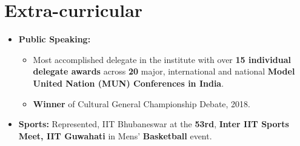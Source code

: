 \documentclass[a4paper,20pt]{article}
\newcommand{\resumeItem}[2]{
  \item\small{
    {#1}{#2 \vspace{-2pt}}
  }
}
\newcommand{\resumeSubItem}[2]{\resumeItem{#1}{#2}\vspace{-2pt}}
\newcommand{\resumeSubHeadingListStart}{\begin{itemize}[leftmargin=*]}
\newcommand{\resumeSubHeadingListEnd}{\end{itemize}}
\newcommand{\resumeItemListStart}{\begin{itemize}}
\newcommand{\resumeItemListEnd}{\end{itemize}\vspace{-2.2pt}}
\begin{document}
\section{Extra-curricular}
\resumeSubHeadingListStart
\resumeSubItem{\textbf{Public Speaking: }}
{}
\vspace{-4pt}
\resumeItemListStart[leftmargin=*]
        \resumeItem{}
          {\normalsize{Most accomplished delegate in the institute with over \textbf{15 individual delegate awards} across \textbf{20} major, international and national \textbf{Model United Nation (MUN) Conferences in India}}.}
        \resumeItem{}
          {\textbf{Winner} of Cultural General Championship Debate, 2018.}
\resumeItemListEnd
\vspace{-4pt}
\resumeSubItem{\textbf{Sports: }}{Represented, IIT Bhubaneswar at the \textbf{53rd}, \textbf{Inter IIT Sports Meet, IIT Guwahati} in Mens’ \textbf{Basketball} event.}
\vspace{-4pt}
\resumeSubHeadingListEnd
\end{document}
